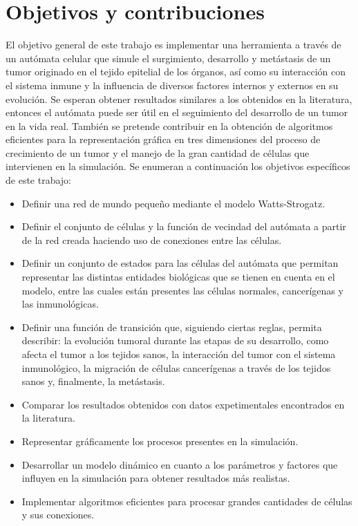 \section{Objetivos y contribuciones} 
\hspace{.1cm}El objetivo general de este trabajo es implementar una herramienta a trav\'es de un aut\'omata celular que simule el surgimiento, desarrollo y met\'astasis de un tumor originado en el tejido epitelial de los \'organos, as\'i como su interacción con el sistema inmune y la influencia de diversos factores internos y externos en su evoluci\'on. Se esperan obtener resultados similares a los obtenidos en la literatura, entonces el aut\'omata puede ser \'util en el seguimiento del desarrollo de un tumor en la vida real. También se pretende contribuir en la obtenci\'on de algoritmos eficientes para la representaci\'on gr\'afica en tres dimensiones del proceso de crecimiento de un tumor y el manejo de la gran cantidad de c\'elulas que intervienen en la simulaci\'on.
Se enumeran a continuaci\'on los objetivos espec\'ificos de este trabajo:
\begin{itemize}
    \item Definir una red de mundo pequeño mediante el modelo Watts-Strogatz.
    \item Definir el conjunto de c\'elulas y la funci\'on de vecindad del aut\'omata a partir de la red creada haciendo uso de conexiones entre las c\'elulas.
    \item Definir un conjunto de estados para las c\'elulas del aut\'omata que permitan representar las distintas entidades biol\'ogicas que se tienen en cuenta en el modelo, entre las cuales est\'an presentes las c\'elulas normales, cancer\'igenas y las inmunol\'ogicas.
    \item Definir una funci\'on de transición que, siguiendo ciertas reglas, permita describir: la evoluci\'on tumoral durante las etapas de su desarrollo, como afecta el tumor a los tejidos sanos, la interacci\'on del tumor con el sistema inmunol\'ogico, la migraci\'on de c\'elulas cancer\'igenas a trav\'es de los tejidos sanos y, finalmente, la met\'astasis.
    \item Comparar los resultados obtenidos con datos expetimentales encontrados en la literatura.
    \item Representar gr\'aficamente los procesos presentes en la simulaci\'on.
    \item Desarrollar un modelo din\'amico en cuanto a los par\'ametros y factores que influyen en la simulaci\'on para obtener resultados m\'as realistas.
    \item Implementar algoritmos eficientes para procesar grandes cantidades de células y sus conexiones.
\end{itemize}